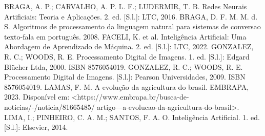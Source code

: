 \documentclass[conference]{IEEEtran}
\begin{document}

\begin{thebibliography}{00}
     BRAGA, A. P.; CARVALHO, A. P. L. F.; LUDERMIR, T. B. Redes Neurais
    Artificiais: Teoria e Aplicações. 2. ed. [S.l.]: LTC, 2016.
     BRAGA, D. F. M. M. d. S. Algoritmos de processamento da linguagem natural para
    sistemas de conversao texto-fala em português. 2008.
     FACELI, K. et al. Inteligência Artificial: Uma Abordagem de Aprendizado de
    Máquina. 2. ed. [S.l.]: LTC, 2022.
     GONZALEZ, R. C.; WOODS, R. E. Processamento Digital de Imagens. 1. ed. [S.l.]:
    Edgard Blücher Ltda, 2000. ISBN 8576054019.
     GONZALEZ, R. C.; WOODS, R. E. Processamento Digital de Imagens. [S.l.]:
    Pearson Universidades, 2009. ISBN 8576054019. 
     LAMAS, F. M. A evolução da agricultura do brasil. EMBRAPA, 2023.
    Disponível em: <https://www.embrapa.br/busca-de-noticias/-/noticia/81665485/
    artigo---a-evolucao-da-agricultura-do-brasil>.
     LIMA, I.; PINHEIRO, C. A. M.; SANTOS, F. A. O. Inteligência Artificial. 1. ed. [S.l.]:
    Elsevier, 2014.
\end{thebibliography}
\vspace{12pt}
\end{document}
